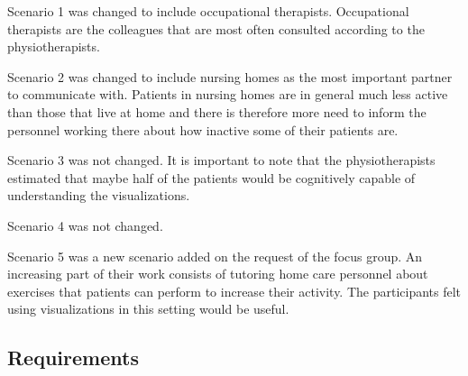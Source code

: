 Scenario 1 was changed to include occupational therapists. Occupational therapists are the colleagues that are most often consulted according to the physiotherapists. 

Scenario 2 was changed to include nursing homes as the most important partner to communicate with. Patients in nursing homes are in general much less active than those that live at home and there is therefore more need to inform the personnel working there about how inactive some of their patients are.

Scenario 3 was not changed. It is important to note that the physiotherapists estimated that maybe half of the patients would be cognitively capable of understanding the visualizations.

Scenario 4 was not changed.

Scenario 5 was a new scenario added on the request of the focus group. An increasing part of their work consists of tutoring home care personnel about exercises that patients can perform to increase their activity. The participants felt using visualizations in this setting would be useful. 

\subsection{Requirements}


